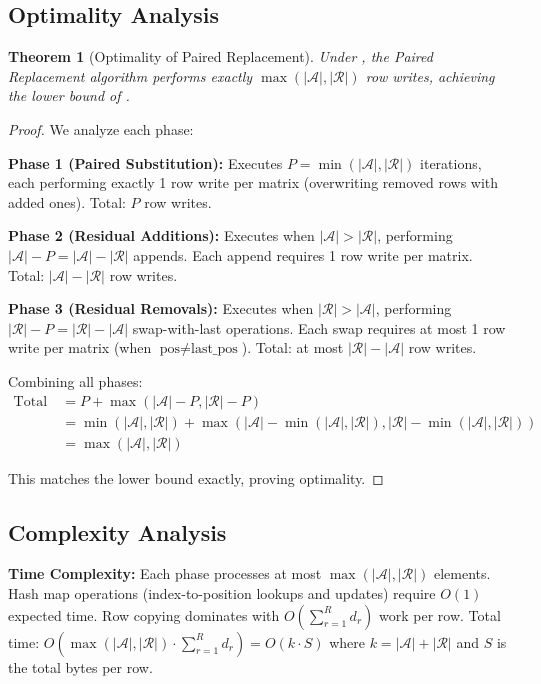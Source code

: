 \documentclass{article}
\numberwithin{equation}{section}
\theoremstyle{plain}
\newtheorem{theorem}{Theorem}[section]
\theoremstyle{definition}
\theoremstyle{remark}
\begin{document}
\subsection{Optimality Analysis}

\begin{theorem}[Optimality of Paired Replacement]
\label{thm:optimality}
Under , the Paired Replacement algorithm performs exactly $\max(|\mathcal{A}|, |\mathcal{R}|)$ row writes, achieving the lower bound of .
\end{theorem}

\begin{proof}
We analyze each phase:

\textbf{Phase 1 (Paired Substitution):} Executes $P = \min(|\mathcal{A}|, |\mathcal{R}|)$ iterations, each performing exactly 1 row write per matrix (overwriting removed rows with added ones). Total: $P$ row writes.

\textbf{Phase 2 (Residual Additions):} Executes when $|\mathcal{A}| > |\mathcal{R}|$, performing $|\mathcal{A}| - P = |\mathcal{A}| - |\mathcal{R}|$ appends. Each append requires 1 row write per matrix. Total: $|\mathcal{A}| - |\mathcal{R}|$ row writes.

\textbf{Phase 3 (Residual Removals):} Executes when $|\mathcal{R}| > |\mathcal{A}|$, performing $|\mathcal{R}| - P = |\mathcal{R}| - |\mathcal{A}|$ swap-with-last operations. Each swap requires at most 1 row write per matrix (when $\text{pos} \neq \text{last\_pos}$). Total: at most $|\mathcal{R}| - |\mathcal{A}|$ row writes.

Combining all phases:
\begin{align}
\text{Total row writes} &= P + \max(|\mathcal{A}| - P, |\mathcal{R}| - P) \\
&= \min(|\mathcal{A}|, |\mathcal{R}|) + \max(|\mathcal{A}| - \min(|\mathcal{A}|, |\mathcal{R}|), |\mathcal{R}| - \min(|\mathcal{A}|, |\mathcal{R}|)) \\
&= \max(|\mathcal{A}|, |\mathcal{R}|)
\end{align}

This matches the lower bound exactly, proving optimality.
\end{proof}

\subsection{Complexity Analysis}

\textbf{Time Complexity:} Each phase processes at most $\max(|\mathcal{A}|, |\mathcal{R}|)$ elements. Hash map operations (index-to-position lookups and updates) require $O(1)$ expected time. Row copying dominates with $O(\sum_{r=1}^R d_r)$ work per row. Total time: $O(\max(|\mathcal{A}|, |\mathcal{R}|) \cdot \sum_{r=1}^R d_r) = O(k \cdot S)$ where $k = |\mathcal{A}| + |\mathcal{R}|$ and $S$ is the total bytes per row.
\end{document}
